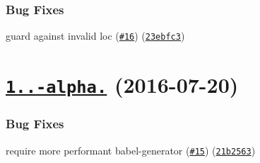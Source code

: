 \subsubsection*{Bug Fixes}


\begin{DoxyItemize}
\item guard against invalid loc (\href{https://github.com/istanbuljs/istanbul-lib-instrument/issues/16}{\tt \#16}) (\href{https://github.com/istanbuljs/istanbul-lib-instrument/commit/23ebfc3}{\tt 23ebfc3})
\end{DoxyItemize}

\label{_1.1.0-alpha.4}%
 \section*{\href{https://github.com/istanbuljs/istanbul-lib-instrument/compare/v1.0.0-alpha.5...v1.1.0-alpha.4}{\tt 1..-\/alpha.} (2016-\/07-\/20)}

\subsubsection*{Bug Fixes}


\begin{DoxyItemize}
\item require more performant babel-\/generator (\href{https://github.com/istanbuljs/istanbul-lib-instrument/issues/15}{\tt \#15}) (\href{https://github.com/istanbuljs/istanbul-lib-instrument/commit/21b2563}{\tt 21b2563}) 
\end{DoxyItemize}